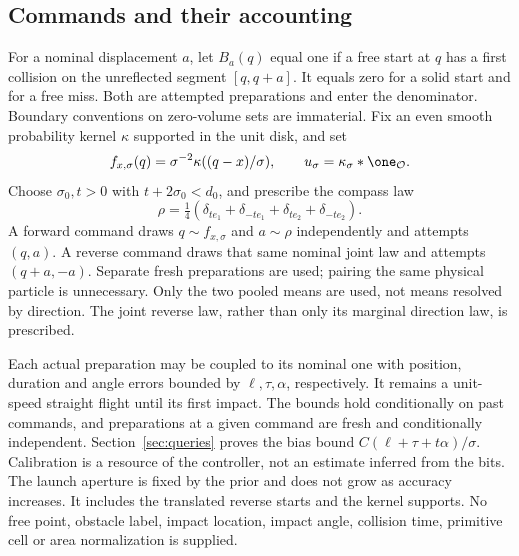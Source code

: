 \subsection{Commands and their accounting}
For a nominal displacement $a$, let $B_a(q)$ equal one if a free start
at $q$ has a first collision on the unreflected segment $[q,q+a]$.
It equals zero for a solid start and for a free miss. Both are attempted
preparations and enter the denominator. Boundary conventions on
zero-volume sets are immaterial. Fix an even smooth probability kernel
$\kappa$ supported in the unit disk, and set
\[
 f_{x,\sigma}(q)=\sigma^{-2}\kappa((q-x)/\sigma),\qquad
 u_\sigma=\kappa_\sigma*\one_{\mathcal O}.
\]
Choose $\sigma_0,t>0$ with $t+2\sigma_0<d_0$, and prescribe the compass
law
\begin{equation}\label{eq:compass}
 \rho=\tfrac14(\delta_{te_1}+\delta_{-te_1}
                         +\delta_{te_2}+\delta_{-te_2}).
\end{equation}
A forward command draws $q\sim f_{x,\sigma}$ and $a\sim\rho$
independently and attempts $(q,a)$. A reverse command draws that same
nominal joint law and attempts $(q+a,-a)$. Separate fresh preparations
are used; pairing the same physical particle is unnecessary. Only the
two pooled means are used, not means resolved by direction. The joint
reverse law, rather than only its marginal direction law, is prescribed.

Each actual preparation may be coupled to its nominal one with position,
duration and angle errors bounded by $\ell,\tau,\alpha$, respectively.
It remains a unit-speed straight flight until its first impact. The
bounds hold conditionally on past commands, and preparations at a given
command are fresh and conditionally independent. Section~\ref{sec:queries}
proves the bias bound $C(\ell+\tau+t\alpha)/\sigma$. Calibration is a
resource of the controller, not an estimate inferred from the bits.
The launch aperture is fixed by the prior and does not grow as accuracy
increases. It includes the translated reverse starts and the kernel
supports. No free point, obstacle label, impact location, impact angle,
collision time, primitive cell or area normalization is supplied.

